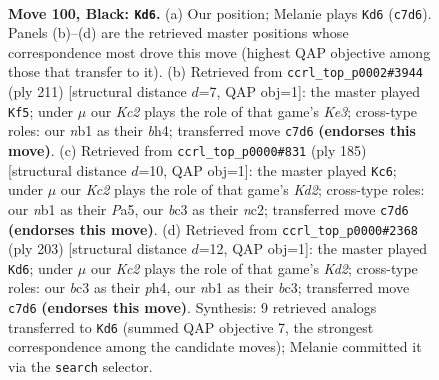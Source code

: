 \documentclass[11pt]{article}
\begin{document}
\clearpage

\begin{figure}[p]\centering
\begin{subfigure}{0.46\textwidth}\centering
\resizebox{\linewidth}{!}{%
\newchessgame
\chessboard[
  setfen={8/2k5/8/8/p1p3b1/2B5/5K2/1N6 b - - 55 100},
  showmover=false,
  pgfstyle=straightmove, color=movearrow, markmove={c7-d6}
]}
\caption{}
\end{subfigure}\hfill
\begin{subfigure}{0.46\textwidth}\centering
\resizebox{\linewidth}{!}{%
\newchessgame
\chessboard[
  setfen={8/1b6/4k3/7p/5p1B/8/8/6K1 b - - 59 106},
  showmover=false,
  pgfstyle=straightmove, color=movearrow, markmove={e6-f5}
]}
\caption{}
\end{subfigure}
\\[4pt]
\begin{subfigure}{0.46\textwidth}\centering
\resizebox{\linewidth}{!}{%
\newchessgame
\chessboard[
  setfen={8/3k4/8/p7/P2K4/8/2N1p3/8 b - - 53 93},
  showmover=false,
  pgfstyle=straightmove, color=movearrow, markmove={d7-c6}
]}
\caption{}
\end{subfigure}\hfill
\begin{subfigure}{0.46\textwidth}\centering
\resizebox{\linewidth}{!}{%
\newchessgame
\chessboard[
  setfen={8/3k4/p7/7p/7P/1KB5/8/5b2 b - - 33 102},
  showmover=false,
  pgfstyle=straightmove, color=movearrow, markmove={d7-d6}
]}
\caption{}
\end{subfigure}
\caption{\textbf{Move 100, Black: \texttt{Kd6}.} (a) Our position; Melanie plays \texttt{Kd6} (\texttt{c7d6}). Panels (b)--(d) are the retrieved master positions whose correspondence most drove this move (highest QAP objective among those that transfer to it). (b) Retrieved from \texttt{ccrl\_top\_p0002\#3944} (ply 211) [structural distance $d$=7, QAP obj=1]: the master played \texttt{Kf5}; under $\mu$ our \emph{Kc2} plays the role of that game's \emph{Ke3}; cross-type roles: our \emph{n}b1 as their \emph{b}h4; transferred move \texttt{c7d6} \textbf{(endorses this move)}. (c) Retrieved from \texttt{ccrl\_top\_p0000\#831} (ply 185) [structural distance $d$=10, QAP obj=1]: the master played \texttt{Kc6}; under $\mu$ our \emph{Kc2} plays the role of that game's \emph{Kd2}; cross-type roles: our \emph{n}b1 as their \emph{P}a5, our \emph{b}c3 as their \emph{n}c2; transferred move \texttt{c7d6} \textbf{(endorses this move)}. (d) Retrieved from \texttt{ccrl\_top\_p0000\#2368} (ply 203) [structural distance $d$=12, QAP obj=1]: the master played \texttt{Kd6}; under $\mu$ our \emph{Kc2} plays the role of that game's \emph{Kd2}; cross-type roles: our \emph{b}c3 as their \emph{p}h4, our \emph{n}b1 as their \emph{b}c3; transferred move \texttt{c7d6} \textbf{(endorses this move)}. Synthesis: 9 retrieved analogs transferred to \texttt{Kd6} (summed QAP objective 7, the strongest correspondence among the candidate moves); Melanie committed it via the \texttt{search} selector.}
\label{fig:thought-m199}
\end{figure}
\end{document}
